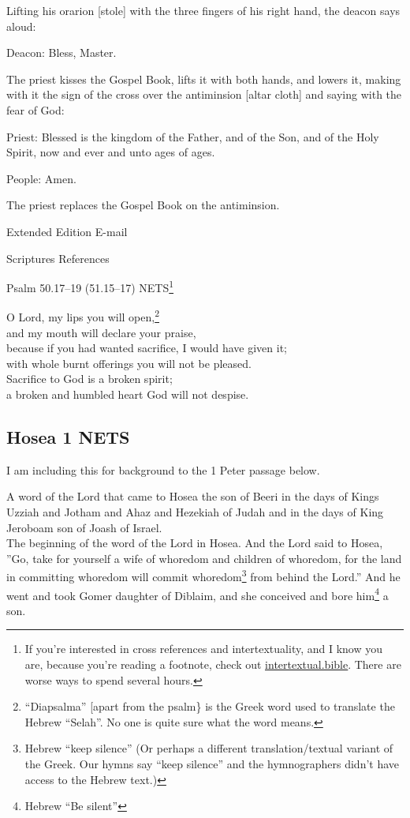\documentclass[
]{article}
\newcommand{\RL}[1]{\beginR #1\endR}
\begin{document}
Lifting his orarion {[}stole{]} with the three fingers of his right
hand, the deacon says aloud:

Deacon: Bless, Master.

The priest kisses the Gospel Book, lifts it with both hands, and lowers
it, making with it the sign of the cross over the antiminsion {[}altar
cloth{]} and saying with the fear of God:

Priest: Blessed is the kingdom of the Father, and of the Son, and of the
Holy Spirit, now and ever and unto ages of ages.

People: Amen.

The priest replaces the Gospel Book on the antiminsion.

Extended Edition E-mail

Scriptures References

Psalm 50.17--19 (51.15--17) NETS\footnote{If you're interested in cross
  references and intertextuality, and I know you are, because you're
  reading a footnote, check out
  \href{http://intertextual.bible}{\ul{intertextual.bible}}. There are
  worse ways to spend several hours.}

O Lord, my lips you will open,\footnote{``Diapsalma'' {[}apart from the
  psalm\} is the Greek word used to translate the Hebrew ``Selah''. No
  one is quite sure what the word means.}\\
and my mouth will declare your praise,\\
because if you had wanted sacrifice, I would have given it;\\
with whole burnt offerings you will not be pleased.\\
Sacrifice to God is a broken spirit;\\
a broken and humbled heart God will not despise.

\subsection{Hosea 1 NETS}\label{hosea-1-nets}

I am including this for background to the 1 Peter passage below.

A word of the Lord that came to Hosea the son of Beeri in the days of
Kings Uzziah and Jotham and Ahaz and Hezekiah of Judah and in the days
of King Jeroboam son of Joash of Israel.\\
The beginning of the word of the Lord in Hosea. And the Lord said to
Hosea, \RL{''}Go, take for yourself a wife of whoredom and children of
whoredom, for the land in committing whoredom will commit
whoredom\footnote{Hebrew ``keep silence'' (Or perhaps a different
  translation/textual variant of the Greek. Our hymns say ``keep
  silence'' and the hymnographers didn't have access to the Hebrew
  text.)} from behind the Lord.'' And he went and took Gomer daughter of
Diblaim, and she conceived and bore him\footnote{Hebrew ``Be silent''} a
son.
\end{document}
